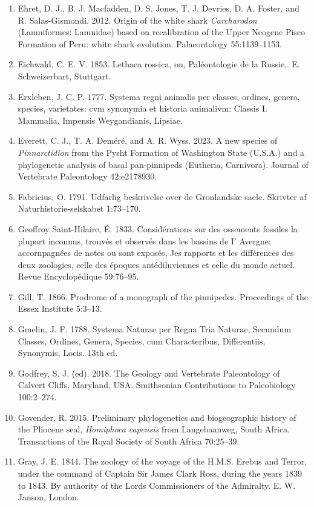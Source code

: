 \documentclass[a4paper, 12pt]{article}
\begin{document}
\begin{enumerate}
\item Ehret, D. J., B. J. Macfadden, D. S. Jones, T. J. Devries, D. A. Foster, and R. Salas-Gismondi. 2012. Origin of the white shark \textit{Carcharodon} (Lamniformes: Lamnidae) based on recalibration of the Upper Neogene Pisco Formation of Peru: white shark evolution. Palaeontology 55:1139–1153.
\item Eichwald, C. E. V. 1853. Lethaea rossica, ou, Paléontologie de la Russie,. E. Schweizerbart, Stuttgart.
\item Erxleben, J. C. P. 1777. Systema regni animalis per classes, ordines, genera, species, varietates: cvm synonymia et historia animalivm: Classis I. Mammalia. Impensis Weygandianis, Lipsiae.
\item Everett, C. J., T. A. Dem\'{e}r\'{e}, and A. R. Wyss. 2023. A new species of \textit{Pinnarctidion} from the Pysht Formation of Washington State (U.S.A.) and a phylogenetic analysis of basal pan-pinnipeds (Eutheria, Carnivora). Journal of Vertebrate Paleontology 42:e2178930.
\item Fabricius, O. 1791. Udfarlig beskrivelse over de Gronlandske saele. Skrivter af Naturhistorie-selskabet 1:73–170.
\item Geoffroy Saint-Hilaire, \'{E}. 1833. Consid\'{e}rations sur des ossements fossiles la plupart inconnus, trouv\'{e}s et observ\'{e}s dans les bassins de I’ Avergne; accornpagn\'{e}es de notes ou sont expos\'{e}s, Jes rapports et les diff\'{e}rences des deux zoologies, celle des \'{e}poques ant\'{e}diluviennes et celle du monde actuel. Revue Encyclop\'{e}dique 59:76–95.
\item Gill, T. 1866. Prodrome of a monograph of the pinnipedes. Proceedings of the Essex Institute 5:3–13.
\item Gmelin, J. F. 1788. Systema Naturae per Regna Tria Naturae, Secundum Classes, Ordines, Genera, Species, cum Characteribus, Differentiis, Synonymis, Locis. 13th ed.
\item Godfrey, S. J. (ed). 2018. The Geology and Vertebrate Paleontology of Calvert Cliffs, Maryland, USA. Smithsonian Contributions to Paleobiology 100:2–274.
\item Govender, R. 2015. Preliminary phylogenetics and biogeographic history of the Pliocene seal, \textit{Homiphoca capensis} from Langebaanweg, South Africa. Transactions of the Royal Society of South Africa 70:25–39.
\item Gray, J. E. 1844. The zoology of the voyage of the H.M.S. Erebus and Terror, under the command of Captain Sir James Clark Ross, during the years 1839 to 1843. By authority of the Lords Commissioners of the Admiralty. E. W. Janson, London.

\end{enumerate}
\end{document}
